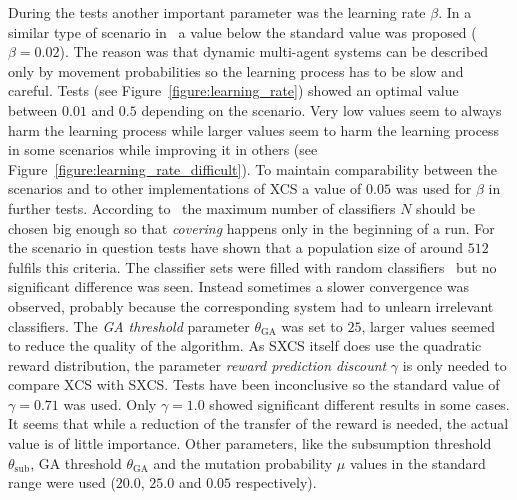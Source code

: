 During the tests another important parameter was the learning rate $\beta$. In a similar type of scenario in~\cite{1102281} a value below the standard value was proposed (\(\beta = 0.02\)). The reason was that dynamic multi-agent systems can be described only by movement probabilities so the learning process has to be slow and careful. Tests (see Figure~\ref{figure:learning_rate}) showed an optimal value between \(0.01\) and \(0.5\) depending on the scenario. Very low values seem to always harm the learning process while larger values seem to harm the learning process in some scenarios while improving it in others (see Figure~\ref{figure:learning_rate_difficult}). To maintain comparability between the scenarios and to other implementations of XCS a value of \(0.05\) was used for $\beta$ in further tests. According to~\cite{BW02} the maximum number of classifiers $N$ should be chosen big enough so that \emph{covering} happens only in the beginning of a run. For the scenario in question tests have shown that a population size of around $512$ fulfils this criteria. The classifier sets were filled with random classifiers~\cite{Butz2006} but no significant difference was seen. Instead sometimes a slower convergence was observed, probably because the corresponding system had to unlearn irrelevant classifiers. The \emph{GA threshold} parameter $\theta_{\mathrm{GA}}$ was set to $25$, larger values seemed to reduce the quality of the algorithm. As SXCS itself does use the quadratic reward distribution, the parameter \emph{reward prediction discount} $\gamma$ is only needed to compare XCS with SXCS. Tests have been inconclusive so the standard value of \(\gamma = 0.71\) was used. Only \(\gamma = 1.0\) showed significant different results in some cases. It seems that while a reduction of the transfer of the reward is needed, the actual value is of little importance. Other parameters, like the subsumption threshold $\theta_{\mathrm{sub}}$, GA threshold $\theta_{\mathrm{GA}}$ and the mutation probability $\mu$ values in the standard range were used ($20.0$, $25.0$ and $0.05$ respectively).




